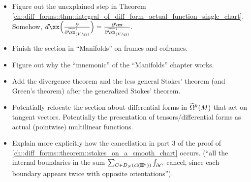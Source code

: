 \begin{itemize}
    
    \item Figure out the unexplained step in Theorem \ref{ch::diff_forms::thm::integral_of_diff_form_actual_function_single_chart}. Somehow, $d\xx \Big( \frac{\pd}{\pd \tx^i_{(V, \yy)}} \Big) = \frac{\pd \xx}{\pd \tx^i_{(V, \yy)}}$. 
    \item Finish the section in ``Manifolds'' on frames and coframes.
    \item Figure out why the ``mnemonic'' of the ``Manifolds'' chapter works.
    \item Add the divergence theorem and the less general Stokes' theorem (and Green's theorem) after the generalized Stokes' theorem.
    \item Potentially relocate the section about differential forms in $\widetilde{\Omega}^k(M)$ that act on tangent vectors. Potentially the presentation of  tensors/differential forms as actual (pointwise) multilinear functions.
    \item Explain more explicitly how the cancellation in part 3 of the proof of \ref{ch::diff_forms::theorem::stokes_on_a_smooth_chart} occurs. (``all the internal boundaries in the sum $\sum_{C \in D_N(\text{cl}(\mathbb{H}^k))} \int_{\partial C}$ cancel, since each boundary appears twice with opposite orientations'').
\end{itemize}